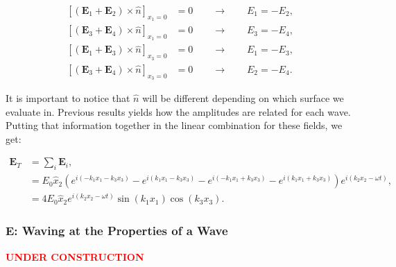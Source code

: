 		
\begin{equation}
	\begin{split}
		\left[\left(\mathbf{E}_{1} + \mathbf{E}_{2}\right) \times \hat{n} \right]_{x_{1}=0} &=0 \qquad \rightarrow \qquad E_{1} = - E_{2},\\
		\left[\left(\mathbf{E}_{3} + \mathbf{E}_{4}\right) \times \hat{n} \right]_{x_{1}=0} &=0 \qquad \rightarrow \qquad E_{3} = - E_{4},\\
		\left[\left(\mathbf{E}_{1} + \mathbf{E}_{3}\right) \times \hat{n} \right]_{x_{3}=0} &=0 \qquad \rightarrow \qquad E_{1} = - E_{3},\\
		\left[\left(\mathbf{E}_{3} + \mathbf{E}_{4}\right) \times \hat{n} \right]_{x_{3}=0} &=0 \qquad \rightarrow \qquad E_{2} = - E_{4}.
	\end{split}
\end{equation}

It is important to notice that $\hat{n}$ will be different depending on which surface we evaluate in. Previous results yields how the amplitudes are related for each wave. Putting that information together in the linear combination for these fields, we get:
	
\begin{equation}
	\begin{split}
		\mathbf{E}_{T} &= \sum_{i} \mathbf{E}_{i}, \\
		&= E_{0} \hat{x}_{2} \left(e^{i\left(-k_{1}x_{1} - k_{3}x_{3} \right)}
		-e^{i\left(k_{1}x_{1} - k_{3}x_{3} \right)}
		-e^{i\left(-k_{1}x_{1} +k_{3}x_{3} \right)}
		-e^{i\left(k_{1}x_{1} + k_{3}x_{3} \right)}\right) e^{i\left(k_{2}x_{2}-\omega t\right)},\\
		&= 4 E_{0} \hat{x}_{2} e^{i\left(k_{2}x_{2} - \omega t\right)} \sin\left(k_{1}x_{1}\right) \cos\left(k_{3}x_{3}\right).
	\end{split}
\end{equation}
		
\subsubsection{E: Waving at the Properties of a Wave}\label{E: Waving at the Properties of a Wave}
\textbf{\textcolor{red}{UNDER CONSTRUCTION}}
	


